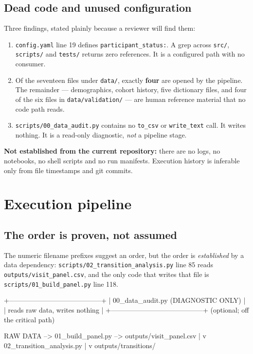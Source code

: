 \documentclass[11pt,a4paper]{article}
\newcommand{\code}[1]{\texttt{\small #1}}
\begin{document}
\subsection{Dead code and unused configuration}

Three findings, stated plainly because a reviewer will find them:

\begin{enumerate}
  \item \code{config.yaml} line 19 defines \code{participant\_status:}. A grep
        across \code{src/}, \code{scripts/} and \code{tests/} returns zero
        references. It is a configured path with no consumer.
  \item Of the seventeen files under \code{data/}, exactly \textbf{four} are
        opened by the pipeline. The remainder --- demographics, cohort history,
        five dictionary files, and four of the six files in
        \code{data/validation/} --- are human reference material that no code
        path reads.
  \item \code{scripts/00\_data\_audit.py} contains no \code{to\_csv} or
        \code{write\_text} call. It writes nothing. It is a read-only
        diagnostic, \emph{not} a pipeline stage.
\end{enumerate}

\noindent
\textbf{Not established from the current repository:} there are no logs, no
notebooks, no shell scripts and no run manifests. Execution history is
inferable only from file timestamps and git commits.

\section{Execution pipeline}

\subsection{The order is proven, not assumed}

The numeric filename prefixes suggest an order, but the order is
\emph{established} by a data dependency:
\code{scripts/02\_transition\_analysis.py} line 85 reads
\code{outputs/visit\_panel.csv}, and the only code that writes that file is
\code{scripts/01\_build\_panel.py} line 118.

\begin{codeblock}
        +-----------------------------------------+
        |  00_data_audit.py    (DIAGNOSTIC ONLY)  |
        |  reads raw data, writes nothing         |
        +-----------------------------------------+
                (optional; off the critical path)

  RAW DATA --> 01_build_panel.py --> outputs/visit_panel.csv
                                              |
                                              v
                               02_transition_analysis.py
                                              |
                                              v
                                    outputs/transitions/
\end{codeblock}
\end{document}
